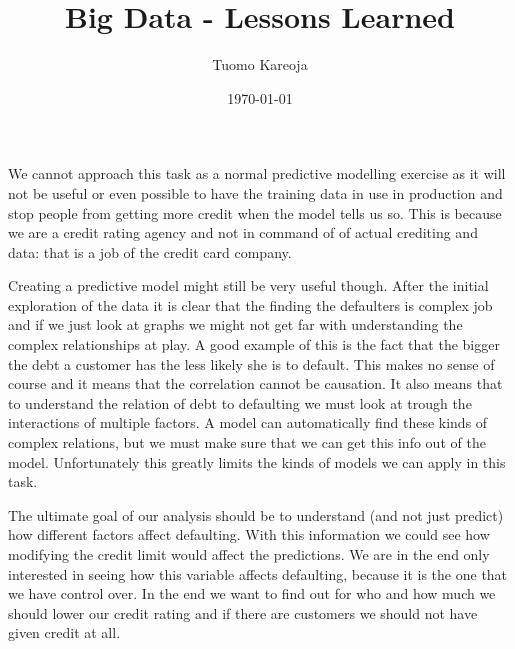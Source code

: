 \documentclass[12pt,a4paper,leqno]{report}
\title{Big Data - Lessons Learned}
\author{Tuomo Kareoja}
\date{\today}
\theoremstyle{plain}
\theoremstyle{definition}
\theoremstyle{remark}
\begin{document}
\maketitle

We cannot approach this task as a normal predictive modelling exercise
as it will not be useful or even possible to have the training data
in use in production and stop people from getting more credit when the model
tells us so. This is because we are a credit rating agency and not in command of
of actual crediting and data: that is a job of the credit card company.

Creating a predictive model might still be very useful though. After the
initial exploration of the data it is clear that the finding the defaulters
is complex job and if we just look at graphs we might not get far with understanding
the complex relationships at play. A good example of this is the fact that the bigger
the debt a customer has the less likely she is to default. This makes no sense of course
and it means that the correlation cannot be causation. It also means that to understand
the relation of debt to defaulting we must look at trough the interactions of multiple factors.
A model can automatically find these kinds of complex relations,
but we must make sure that we can get this info out of the model. Unfortunately this greatly
limits the kinds of models we can apply in this task.

The ultimate goal of our analysis should be to understand (and not just predict) how
different factors affect defaulting. With this information we could see how modifying the
credit limit would affect the predictions. We are in the end only interested in seeing how this
variable affects defaulting, because it is the one that we have control over. In the end we
want to find out for who and how much we should lower our credit rating and if there are
customers we should not have given credit at all.
\end{document}

